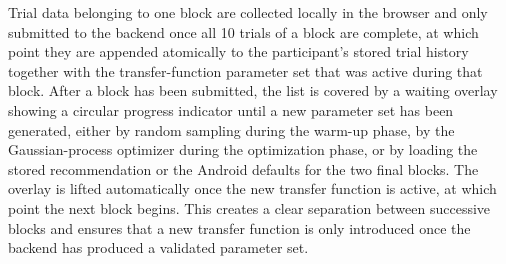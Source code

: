 Trial data belonging to one block are collected locally in the browser and only submitted to the backend once all 10 trials of a block are complete, at which point they are appended atomically to the participant's stored trial history together with the transfer-function parameter set that was active during that block. After a block has been submitted, the list is covered by a waiting overlay showing a circular progress indicator until a new parameter set has been generated, either by random sampling during the warm-up phase, by the Gaussian-process optimizer during the optimization phase, or by loading the stored recommendation or the Android defaults for the two final blocks. The overlay is lifted automatically once the new transfer function is active, at which point the next block begins. This creates a clear separation between successive blocks and ensures that a new transfer function is only introduced once the backend has produced a validated parameter set.
